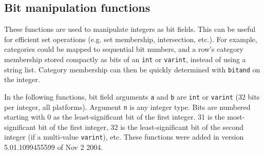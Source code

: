 \subsection{Bit manipulation functions}

  These functions are used to manipulate integers as bit fields.  This
can be useful for efficient set operations (e.g. set membership,
intersection, etc.).  For example, categories could be mapped to
sequential bit numbers, and a row's category membership stored
compactly as bits of an \verb`int` or \verb`varint`, instead of using a
string list.  Category membership can then be quickly determined with
\verb`bitand` on the integer.

  In the following functions, bit field arguments \verb`a` and
\verb`b` are \verb`int` or \verb`varint` (32 bits per integer, all platforms).
Argument \verb`n` is any integer type.  Bits are numbered starting
with 0 as the least-significant bit of the first integer.  31 is the
most-significant bit of the first integer, 32 is the least-significant
bit of the second integer (if a multi-value \verb`varint`), etc.
These functions were added in version 5.01.1099455599 of Nov 2 2004.

